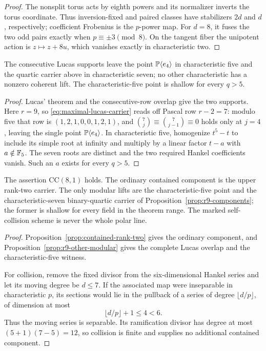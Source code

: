 \begin{proof}
The nonsplit torus acts by eighth powers and its normalizer inverts the
torus coordinate.  Thus inversion-fixed and paired classes have
stabilizers $2d$ and $d$, respectively; coefficient Frobenius is the
$p$-power map.  For $d=8$, it fuses the two odd pairs exactly when
$p\equiv\pm3\pmod8$.  On the tangent fiber the unipotent action is
$z\mapsto z+8u$, which vanishes exactly in characteristic two.
\end{proof}

\begin{proposition}\label{prop:r9-other-modular}%
%
The consecutive Lucas supports leave the point $\mathbb P\langle e_4\rangle$ in
characteristic five and the quartic carrier above in characteristic
seven; no other characteristic has a nonzero coherent lift.  The
characteristic-five point is shallow for every $q>5$.
\end{proposition}

\begin{proof}
Lucas' theorem and the consecutive-row overlap give the two supports.
Here $r=9$, so \eqref{eq:maximal-lucas-carrier} reads off Pascal row
$r-2=7$: modulo five that row is $(1,2,1,0,0,1,2,1)$, and
$\binom7j\equiv\binom7{j-1}\equiv0$ holds only at $j=4$, leaving the
single point $\mathbb P\langle e_4\rangle$.
In characteristic five, homogenize $t^5-t$ to include its simple root
at infinity and multiply by a linear factor $t-a$ with
$a\notin\mathbb F_5$.  The seven roots are distinct and the two required
Hankel coefficients vanish.  Such an $a$ exists for every $q>5$.
\end{proof}

\begin{proposition}
\label{prop:r9-contained}%
%
The assertion $\mathrm{CC}(8,1)$ holds.  The ordinary contained
component is the upper rank-two carrier.  The only modular lifts are
the characteristic-five point and the characteristic-seven
binary-quartic carrier of Proposition~\ref{prop:r9-components}; the
former is shallow for every field in the theorem range.  The marked
self-collision scheme is never the whole polar line.
\end{proposition}

\begin{proof}
Proposition~\ref{prop:contained-rank-two} gives the ordinary component,
and Proposition~\ref{prop:r9-other-modular} gives the complete Lucas
overlap and the characteristic-five witness.

For collision, remove the fixed divisor from the six-dimensional
Hankel series and let its moving degree be $d\leq7$.  If the associated
map were inseparable in characteristic $p$, its sections would lie in
the pullback of a series of degree $\lfloor d/p\rfloor$, of dimension
at most
\[
             \lfloor d/p\rfloor+1\leq4<6.
\]
Thus the moving series is separable.  Its ramification divisor has
degree at most $(5+1)(7-5)=12$, so collision is finite and supplies no
additional contained component.
\end{proof}

